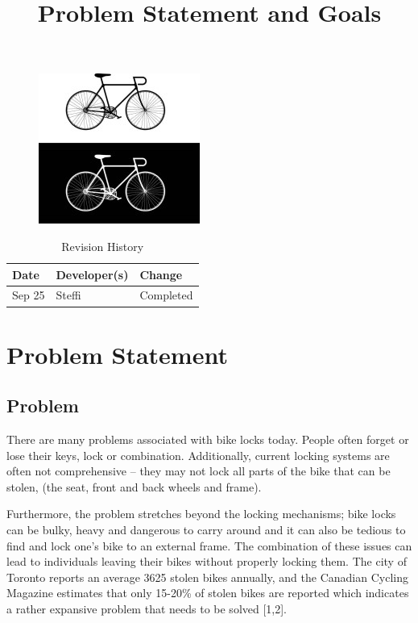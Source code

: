\documentclass{article}
\title{Problem Statement and Goals\\\progname}
\author{\authname}
\date{}
\begin{document}
\maketitle
\begin{figure}[h!]
  \centering
  \includegraphics[width=0.4\linewidth]{../BikeLogo.jpg}
\end{figure}

\begin{table}[hp]
\caption{Revision History} \label{TblRevisionHistory}
\begin{tabularx}{\textwidth}{llX}
\toprule
\textbf{Date} & \textbf{Developer(s)} & \textbf{Change}\\
\midrule
Sep 25 & Steffi & Completed\\
\bottomrule
\end{tabularx}
\end{table}

\newpage
\section{Problem Statement}

\subsection{Problem}

There are many problems associated with bike locks today.  People often forget or lose their keys, lock or combination.  Additionally, current locking systems are often not comprehensive – they may not lock all parts of the bike that can be stolen, (the seat, front and back wheels and frame). 

Furthermore, the problem stretches beyond the locking mechanisms; bike locks can be bulky, heavy and dangerous to carry around and it can also be tedious to find and lock one’s bike to an external frame.  The combination of these issues can lead to individuals leaving their bikes without properly locking them.  The city of Toronto reports an average 3625 stolen bikes annually, and the Canadian Cycling Magazine estimates that only 15-20\% of stolen bikes are reported which indicates a rather expansive problem that needs to be solved [1,2]. 
\end{document}
